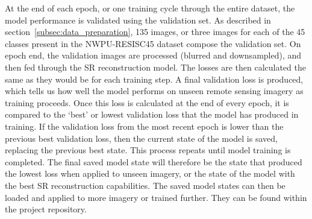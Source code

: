 At the end of each epoch, or one training cycle through the entire dataset, the model performance is validated using the validation set. As described in section~\ref{subsec:data_preparation}, 135 images, or three images for each of the 45 classes present in the NWPU-RESISC45 dataset compose the validation set. On epoch end, the validation images are processed (blurred and downsampled), and then fed through the SR reconstruction model. The losses are then calculated the same as they would be for each training step. A final validation loss is produced, which tells us how well the model performs on unseen remote sensing imagery as training proceeds. Once this loss is calculated at the end of every epoch, it is compared to the `best' or lowest validation loss that the model has produced in training. If the validation loss from the most recent epoch is lower than the previous best validation loss, then the current state of the model is saved, replacing the previous best state. This process repeats until model training is completed. The final saved model state will therefore be the state that produced the lowest loss when applied to unseen imagery, or the state of the model with the best SR reconstruction capabilities. The saved model states can then be loaded and applied to more imagery or trained further. They can be found within the project repository.